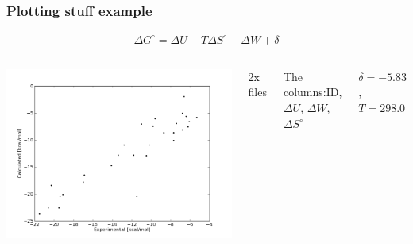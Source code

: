 \begin{frame}[fragile]

    \frametitle{Plotting stuff example}

    \begin{align*}
        \Delta G^\circ = \Delta U - T \Delta S^\circ + \Delta W + \delta
    \end{align*}

    \begin{columns}[t]


            \includegraphics[width=1.0\textwidth]{images/binding_energy.png}


            2x files

            The columns:\newline\newline ID, $\Delta U$, $\Delta W$, $\Delta S^\circ$\newline

            $\delta = -5.83$, $T = 298.0$

    \end{columns}

\end{frame}


